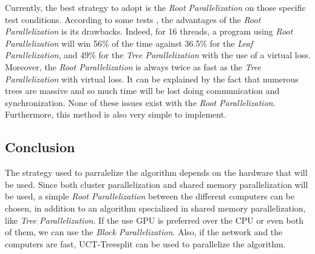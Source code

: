 Currently, the best strategy to adopt is the \emph{Root Parallelization} on those specific test conditions. According to some tests \cite{parallel_comp,tree_root_comp}, the advantages of the \emph{Root Parallelization} is its drawbacks. Indeed, for 16 threads, a program using \emph{Root Parallelization} will win 56\% of the time against 36.5\% for the \emph{Leaf Parallelization}, and 49\% for the \emph{Tree Parallelization} with the use of a virtual loss. Moreover, the \emph{Root Parallelization} is always twice as fast as the \emph{Tree Parallelization} with virtual loss. It can be explained by the fact that numerous trees are massive and so much time will be lost doing communication and synchronization. None of these issues exist with the \emph{Root Parallelization}. Furthermore, this method is also very simple to implement.

\subsection{Conclusion}

The strategy used to parralelize the algorithm depends on the hardware that will be used. Since both cluster parallelization and shared memory parallelization will be used, a simple \emph{Root Parallelization} between the different computers can be chosen, in addition to an algorithm specialized in shared memory parallelization, like \emph{Tree Parallelization}. If the use GPU is preferred over the CPU or even both of them, we can use the \emph{Block Parallelization}. Also, if the network and the computers are fast, UCT-Treesplit can be used to parallelize the algorithm.
